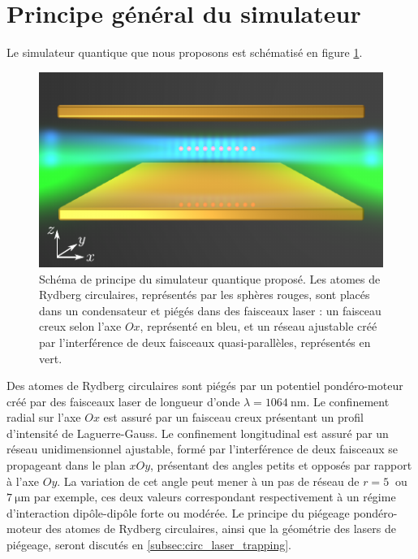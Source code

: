 \section{Principe général du simulateur}
\noindent Le simulateur quantique que nous proposons est schématisé en figure \ref{fig:scheme_simul}.
%
\begin{figure}[t]
\centering
\includegraphics[width=\linewidth]{figures/circsim/scheme_simulator}
\caption[Schéma de principe du simulateur quantique]
{Schéma de principe du simulateur quantique proposé.
Les atomes de Rydberg circulaires, représentés par les sphères rouges, sont placés dans un condensateur et piégés dans des faisceaux laser : un faisceau \og creux \fg{} selon l'axe $Ox$, représenté en bleu, et un réseau ajustable créé par l'interférence de deux faisceaux quasi-parallèles, représentés en vert.
}
\label{fig:scheme_simul}
\end{figure}
%
%
Des atomes de Rydberg circulaires sont piégés par un potentiel pondéro-moteur créé par des faisceaux laser de longueur d'onde $\lambda = \SI{1064}{\nano\meter}$.
Le confinement radial sur l'axe $Ox$ est assuré par un faisceau \og creux \fg{} présentant un profil d'intensité de Laguerre-Gauss.
Le confinement longitudinal est assuré par un réseau unidimensionnel ajustable, formé par l'interférence de deux faisceaux se propageant dans le plan $xOy$, présentant des angles petits et opposés par rapport à l'axe $Oy$.
La variation de cet angle peut mener à un pas de réseau de $r=\SI{5}{}$ ou $\SI{7}{\um}$ par exemple, ces deux valeurs correspondant respectivement à un régime d'interaction dipôle-dipôle forte ou modérée.
Le principe du piégeage pondéro-moteur des atomes de Rydberg circulaires, ainsi que la géométrie des lasers de piégeage, seront discutés en \ref{subsec:circ_laser_trapping}.

